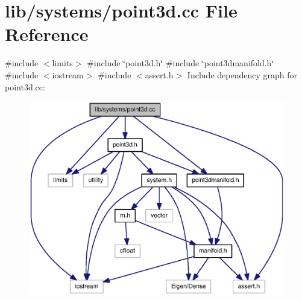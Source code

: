 \section{lib/systems/point3d.cc \-File \-Reference}
\label{point3d_8cc}
{\ttfamily \#include $<$limits$>$}\*
{\ttfamily \#include \char`\"{}point3d.\-h\char`\"{}}\*
{\ttfamily \#include \char`\"{}point3dmanifold.\-h\char`\"{}}\*
{\ttfamily \#include $<$iostream$>$}\*
{\ttfamily \#include $<$assert.\-h$>$}\*
\-Include dependency graph for point3d.\-cc\-:\nopagebreak
\begin{figure}[H]
\begin{center}
\leavevmode
\includegraphics[width=350pt]{point3d_8cc__incl}
\end{center}
\end{figure}
